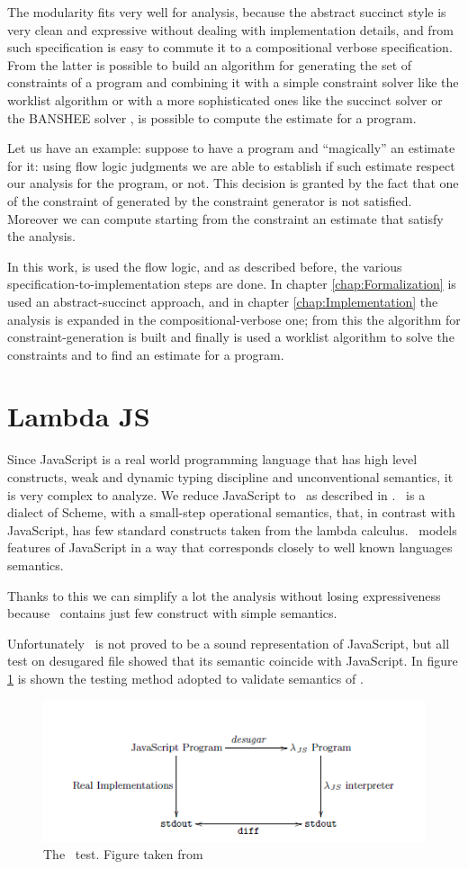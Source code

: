 The modularity fits very well for analysis, because the abstract succinct style is very clean and expressive without dealing with implementation details, and from such specification is easy to commute it to a compositional verbose specification. From the latter is possible to build an algorithm for generating the set of constraints of a program and combining it with a simple constraint solver like the worklist algorithm \cite{PrincipleProgramAnalysis} or with a more sophisticated ones like the succinct solver \cite{SuccinctSolver} or the BANSHEE solver \cite{BansheeSolver}, is possible to compute the estimate for a program.

Let us have an example: suppose to have a program and ``magically'' an estimate for it: using flow logic judgments we are able to establish if such estimate respect our analysis for the program, or not. This decision is granted by the fact that one of the constraint of generated by the constraint generator is not satisfied. Moreover we can compute starting from the constraint an estimate that satisfy the analysis.

In this work, is used the flow logic, and as described before, the various specification-to-implementation steps are done. In chapter \ref{chap:Formalization} is used an abstract-succinct approach, and in chapter \ref{chap:Implementation} the analysis is expanded in the compositional-verbose one; from this the algorithm for constraint-generation is built and finally is used a worklist algorithm to solve the constraints and to find an estimate for a program.

\section{Lambda JS}
Since JavaScript is a real world programming language that has high level constructs, weak and dynamic typing discipline and unconventional semantics, it is very complex to analyze. We reduce JavaScript to \ljs\ as described in \cite{LambdaJS}. \ljs\ is a dialect of Scheme, with a small-step operational semantics, that, in contrast with JavaScript, has few standard constructs taken from the lambda calculus. \ljs\ models features of JavaScript in a way that corresponds closely to well known languages semantics.

Thanks to this we can simplify a lot the analysis without losing expressiveness because \ljs\ contains just few construct with simple semantics.

Unfortunately \ljs\ is not proved to be a sound representation of JavaScript, but all test on desugared file showed that its semantic coincide with JavaScript. In figure \ref{fig:LJS} is shown the testing method adopted to validate semantics of \ljs.

\begin{figure}[htb]
    \centering
    \includegraphics[scale=1]{LambdaJS}
    \caption{The \ljs\ test. Figure taken from \cite{LambdaJS}}
    \label{fig:LJS}
\end{figure}